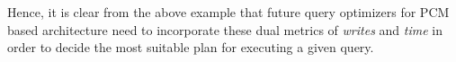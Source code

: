Hence, it is clear from the above example that future query optimizers for PCM based architecture need to incorporate these dual metrics of \emph{writes} and \emph{time} in order to decide the most suitable plan for executing a given query. 
\begin{comment}
\begin{table}[!h]
\centering
\caption{Overview of previous work on operators for PCM }
\label{tab:prev_work}
\begin{small}
\begin{tabular}{p{1.5cm}p{2.3cm}p{1.5cm}p{2cm}}
\toprule  
\textbf{Work} & \textbf{Model} &  \textbf{Operators} & \textbf{Write Guarantees}\\ 
\midrule
Chen et al. \cite{chen} & \textit{PCM\_DRAM} & B$^+$-tree, Hash Join & Hash join writes\\ \hline

Vamsikrishna et al. \cite{vamsi} & \textit {DRAM\_EXPLICIT} & Sort & Writes for basic version of PCM-aware sort\\ \hline

Viglas \cite{viglas} & \textit {DRAM\_EXPLICIT} & Sort, Join & Analysis of a subset of the algorithms presented based on some notion of relative read / write cost\\ 
\bottomrule
\end{tabular}
\end{small}
\end{table} 
\end{comment}
